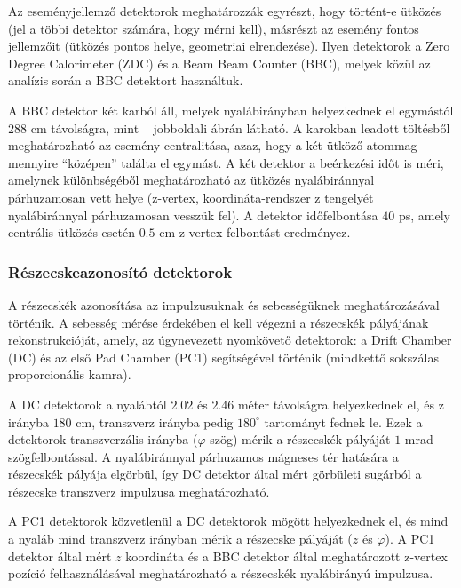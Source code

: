 \documentclass[11pt,a4paper]{article}
\numberwithin{equation}{subsection}
\numberwithin{figure}{section}
\begin{document}
Az eseményjellemző detektorok meghatározzák egyrészt, hogy történt-e ütközés (jel a többi detektor számára, hogy mérni kell), másrészt az esemény fontos jellemzőit (ütközés pontos helye, geometriai elrendezése). Ilyen detektorok a Zero Degree Calorimeter (ZDC) és a Beam Beam Counter (BBC), melyek közül az analízis során a BBC detektort használtuk.

A BBC detektor két karból áll, melyek nyalábirányban helyezkednek el egymástól $288$ cm távolságra, mint ~ jobboldali ábrán látható. A karokban leadott töltésből meghatározható az esemény centralitása, azaz, hogy a két ütköző atommag mennyire ``középen'' találta el egymást. A két detektor a beérkezési időt is méri, amelynek különbségéből meghatározható az ütközés nyalábiránnyal párhuzamosan vett helye (z-vertex, koordináta-rendszer z tengelyét nyalábiránnyal párhuzamosan vesszük fel). A detektor időfelbontása $40$ ps, amely centrális ütközés esetén $0.5$ cm z-vertex felbontást eredményez.
 
\subsubsection{Részecskeazonosító detektorok}\label{sec:phenix2}

A részecskék azonosítása az impulzusuknak és sebességüknek meghatározásával történik. A sebesség mérése érdekében el kell végezni a részecskék pályájának rekonstrukcióját, amely, az úgynevezett nyomkövető detektorok: a Drift Chamber (DC) és az első Pad Chamber (PC1) segítségével történik (mindkettő sokszálas proporcionális kamra). 

A DC detektorok a nyalábtól $2.02$ és $2.46$ méter távolságra helyezkednek el, és z irányba $180$ cm, transzverz irányba pedig $180^{\circ}$ tartományt fednek le. Ezek a detektorok transzverzális irányba ($\varphi$ szög) mérik a részecskék pályáját $1$ mrad szögfelbontással. A nyalábiránnyal párhuzamos mágneses tér hatására a részecskék pályája elgörbül, így DC detektor által mért görbületi sugárból a részecske transzverz impulzusa meghatározható.

A PC1 detektorok közvetlenül a DC detektorok mögött helyezkednek el, és mind a nyaláb mind transzverz irányban mérik a részecske pályáját ($z$ és $\varphi$). A PC1 detektor által mért $z$ koordináta és a BBC detektor által meghatározott z-vertex pozíció felhasználásával meghatározható a részecskék nyalábirányú impulzusa.
\end{document}
